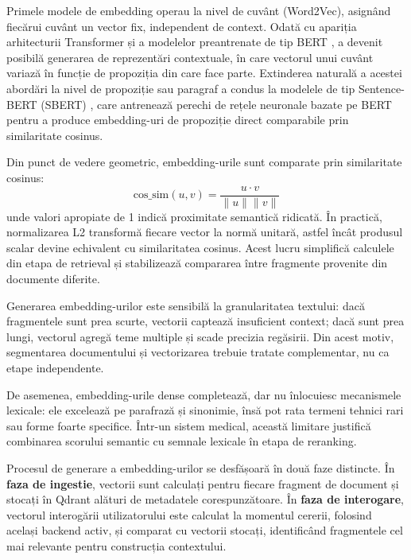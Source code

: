\documentclass[12pt, a4paper, oneside, romanian]{teza-upb}
\begin{document}
Primele modele de embedding operau la nivel de cuvânt (Word2Vec), asignând fiecărui cuvânt un vector fix, independent de context. Odată cu apariția arhitecturii Transformer și a modelelor preantrenate de tip BERT \cite{devlin2018bert}, a devenit posibilă generarea de reprezentări contextuale, în care vectorul unui cuvânt variază în funcție de propoziția din care face parte. Extinderea naturală a acestei abordări la nivel de propoziție sau paragraf a condus la modelele de tip Sentence-BERT (SBERT) \cite{reimers2019sbert}, care antrenează perechi de rețele neuronale bazate pe BERT pentru a produce embedding-uri de propoziție direct comparabile prin similaritate cosinus.

Din punct de vedere geometric, embedding-urile sunt comparate prin similaritate cosinus:
\[
\mathrm{cos\_sim}(u,v)=\frac{u\cdot v}{\|u\|\|v\|}
\]
unde valori apropiate de 1 indică proximitate semantică ridicată. În practică, normalizarea L2 transformă fiecare vector la normă unitară, astfel încât produsul scalar devine echivalent cu similaritatea cosinus. Acest lucru simplifică calculele din etapa de retrieval și stabilizează compararea între fragmente provenite din documente diferite.\cite{levy2024similarity}

Generarea embedding-urilor este sensibilă la granularitatea textului: dacă fragmentele sunt prea scurte, vectorii captează insuficient context; dacă sunt prea lungi, vectorul agregă teme multiple și scade precizia regăsirii. Din acest motiv, segmentarea documentului și vectorizarea trebuie tratate complementar, nu ca etape independente.\cite{levy2024similarity}

De asemenea, embedding-urile dense completează, dar nu înlocuiesc mecanismele lexicale: ele excelează pe parafrază și sinonimie, însă pot rata termeni tehnici rari sau forme foarte specifice. Într-un sistem medical, această limitare justifică combinarea scorului semantic cu semnale lexicale în etapa de reranking.\cite{gao2023retrieval}



Procesul de generare a embedding-urilor se desfășoară în două faze distincte. În \textbf{faza de ingestie}, vectorii sunt calculați pentru fiecare fragment de document și stocați în Qdrant alături de metadatele corespunzătoare. În \textbf{faza de interogare}, vectorul interogării utilizatorului este calculat la momentul cererii, folosind același backend activ, și comparat cu vectorii stocați, identificând fragmentele cel mai relevante pentru construcția contextului.
\end{document}
